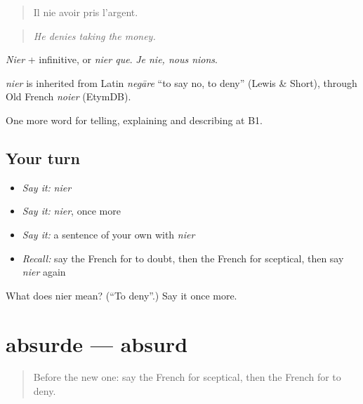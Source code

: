 \begin{quote}
Il nie avoir pris l'argent.
\end{quote}

\begin{quote}
\emph{He denies taking the money.}
\end{quote}

\emph{Nier} + infinitive, or \emph{nier que}. \emph{Je nie, nous nions}.

\begin{cousinweb}
\emph{nier} is inherited from Latin \emph{negāre} \textquotedblleft{}to say no, to deny\textquotedblright{} (Lewis \& Short), through Old French \emph{noier} (EtymDB).
\end{cousinweb}

\begin{grammarlens}[title={What you've built}]
One more word for telling, explaining and describing at B1.
\end{grammarlens}

\subsection*{Your turn}
\begin{itemize}
\raggedright
  \item \emph{Say it:} \emph{nier}
  \item \emph{Say it:} \emph{nier}, once more
  \item \emph{Say it:} a sentence of your own with \emph{nier}
  \item \emph{Recall:} say the French for to doubt, then the French for sceptical, then say \emph{nier} again
\end{itemize}

\begin{tcolorbox}[breakable,colback=teal!4,colframe=teal!35!black,title={Before you move on}]
What does nier mean? (\textquotedblleft{}To deny\textquotedblright{}.) Say it once more.
\end{tcolorbox}
\section[absurde]{absurde — absurd}

\label{lesson:FR-C338-absurde}



\begin{quote}
Before the new one: say the French for sceptical, then the French for to deny.
\end{quote}

